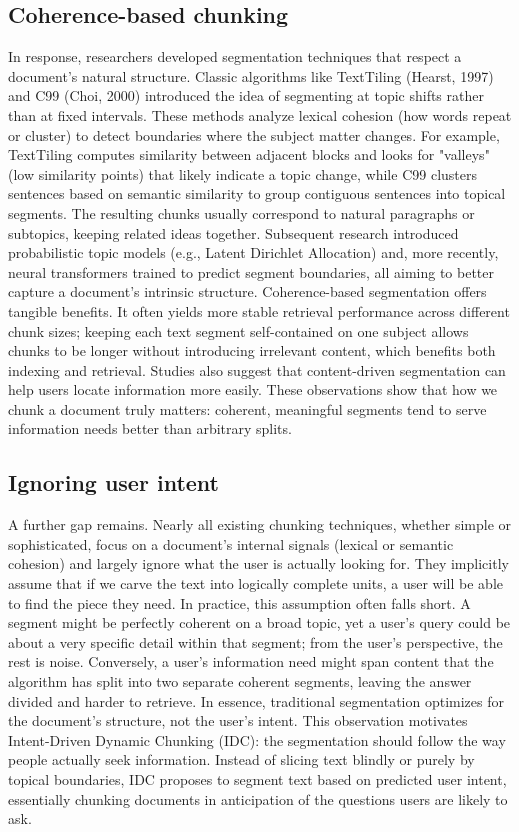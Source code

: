 \documentclass[12pt,a4paper]{report}
\begin{document}
\subsection{Coherence-based chunking}
In response, researchers developed segmentation techniques that respect a document's natural structure. Classic algorithms like TextTiling (Hearst, 1997) and C99 (Choi, 2000) introduced the idea of segmenting at topic shifts rather than at fixed intervals. These methods analyze lexical cohesion (how words repeat or cluster) to detect boundaries where the subject matter changes. For example, TextTiling computes similarity between adjacent blocks and looks for "valleys" (low similarity points) that likely indicate a topic change, while C99 clusters sentences based on semantic similarity to group contiguous sentences into topical segments. The resulting chunks usually correspond to natural paragraphs or subtopics, keeping related ideas together. Subsequent research introduced probabilistic topic models (e.g., Latent Dirichlet Allocation) and, more recently, neural transformers trained to predict segment boundaries, all aiming to better capture a document's intrinsic structure. Coherence-based segmentation offers tangible benefits. It often yields more stable retrieval performance across different chunk sizes; keeping each text segment self-contained on one subject allows chunks to be longer without introducing irrelevant content, which benefits both indexing and retrieval. Studies also suggest that content-driven segmentation can help users locate information more easily. These observations show that how we chunk a document truly matters: coherent, meaningful segments tend to serve information needs better than arbitrary splits.

\subsection{Ignoring user intent}
A further gap remains. Nearly all existing chunking techniques, whether simple or sophisticated, focus on a document's internal signals (lexical or semantic cohesion) and largely ignore what the user is actually looking for. They implicitly assume that if we carve the text into logically complete units, a user will be able to find the piece they need. In practice, this assumption often falls short. A segment might be perfectly coherent on a broad topic, yet a user's query could be about a very specific detail within that segment; from the user's perspective, the rest is noise. Conversely, a user's information need might span content that the algorithm has split into two separate coherent segments, leaving the answer divided and harder to retrieve. In essence, traditional segmentation optimizes for the document's structure, not the user's intent. This observation motivates Intent-Driven Dynamic Chunking (IDC): the segmentation should follow the way people actually seek information. Instead of slicing text blindly or purely by topical boundaries, IDC proposes to segment text based on predicted user intent, essentially chunking documents in anticipation of the questions users are likely to ask.
\end{document}
